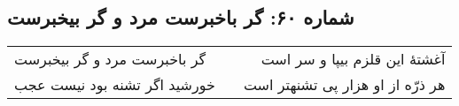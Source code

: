\begin{center}
\section*{شماره ۶۰: گر باخبرست مرد و گر بیخبرست}
\label{sec:060}
\begin{longtable}{l p{0.5cm} r}
گر باخبرست مرد و گر بیخبرست
&&
آغشتهٔ این قلزم بیپا و سر است
\\
خورشید اگر تشنه بود نیست عجب
&&
هر ذرّه از او هزار پی تشنهتر است
\\
\end{longtable}
\end{center}
